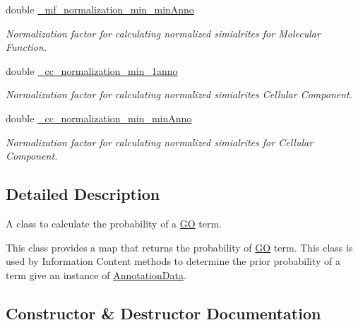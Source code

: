 \begin{DoxyCompactItemize}
double \hyperlink{classTermProbabilityMap_adfbe0bba2e300c32941c7d83f8e3febb}{\+\_\+mf\+\_\+normalization\+\_\+min\+\_\+min\+Anno}
\begin{DoxyCompactList}\small\item\em Normalization factor for calculating normalized simialrites for Molecular Function. \end{DoxyCompactList}\item 
double \hyperlink{classTermProbabilityMap_a8c16045a4e738758ff5510c04da20290}{\+\_\+cc\+\_\+normalization\+\_\+min\+\_\+1anno}
\begin{DoxyCompactList}\small\item\em Normalization factor for calculating normalized simialrites Cellular Component. \end{DoxyCompactList}\item 
double \hyperlink{classTermProbabilityMap_a5a665cb81ee03caca135a9a36cd544a1}{\+\_\+cc\+\_\+normalization\+\_\+min\+\_\+min\+Anno}
\begin{DoxyCompactList}\small\item\em Normalization factor for calculating normalized simialrites for Cellular Component. \end{DoxyCompactList}\end{DoxyCompactItemize}


\subsection{Detailed Description}
A class to calculate the probability of a \hyperlink{namespaceGO}{GO} term. 

This class provides a map that returns the probability of \hyperlink{namespaceGO}{GO} term. This class is used by Information Content methods to determine the prior probability of a term give an instance of \hyperlink{classAnnotationData}{Annotation\+Data}. 

\subsection{Constructor \& Destructor Documentation}
